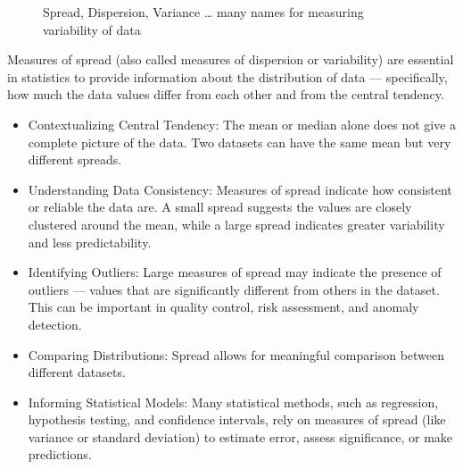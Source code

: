 \documentclass[
  a4paper,
]{scrbook}
\begin{document}
\begin{figure}[ht]


\caption{\label{fig-spread}Spread, Dispersion, Variance \ldots{} many
names for measuring variability of data}

\end{figure}%

Measures of spread (also called measures of dispersion or variability)
are essential in statistics to provide information about the
distribution of data --- specifically, how much the data values differ
from each other and from the central tendency.

\begin{itemize}
\item
  Contextualizing Central Tendency: The mean or median alone does not
  give a complete picture of the data. Two datasets can have the same
  mean but very different spreads.
\item
  Understanding Data Consistency: Measures of spread indicate how
  consistent or reliable the data are. A small spread suggests the
  values are closely clustered around the mean, while a large spread
  indicates greater variability and less predictability.
\item
  Identifying Outliers: Large measures of spread may indicate the
  presence of outliers --- values that are significantly different from
  others in the dataset. This can be important in quality control, risk
  assessment, and anomaly detection.
\item
  Comparing Distributions: Spread allows for meaningful comparison
  between different datasets.
\item
  Informing Statistical Models: Many statistical methods, such as
  regression, hypothesis testing, and confidence intervals, rely on
  measures of spread (like variance or standard deviation) to estimate
  error, assess significance, or make predictions.
\end{itemize}
\end{document}
